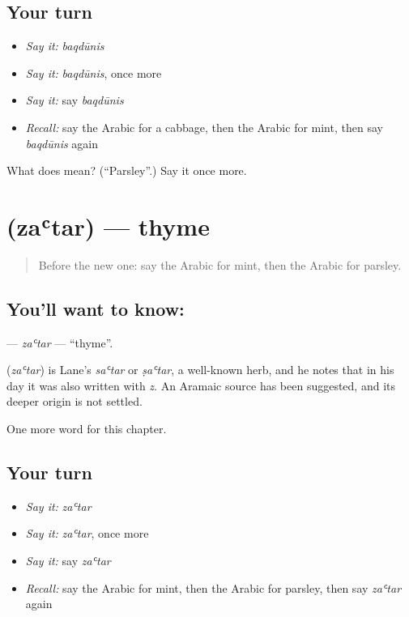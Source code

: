 \subsection*{Your turn}
\begin{itemize}
\raggedright
  \item \emph{Say it:} \emph{baqdūnis}
  \item \emph{Say it:} \emph{baqdūnis}, once more
  \item \emph{Say it:} say \emph{baqdūnis}
  \item \emph{Recall:} say the Arabic for a cabbage, then the Arabic for mint, then say \emph{baqdūnis} again
\end{itemize}

\begin{tcolorbox}[breakable,colback=teal!4,colframe=teal!35!black,title={Before you move on}]
What does  mean? (\textquotedblleft{}Parsley\textquotedblright{}.) Say it once more.
\end{tcolorbox}
\section[\texorpdfstring{\ar{زعتر} (zaʿtar)}{زعتر (zaʿtar)}]{ (zaʿtar) — thyme}

\label{lesson:AR-C121-zatar}



\begin{quote}
Before the new one: say the Arabic for mint, then the Arabic for parsley.
\end{quote}

\subsection*{You'll want to know: }
\textbf{} — \emph{zaʿtar} — \textquotedblleft{}thyme\textquotedblright{}.

\begin{cousinweb}
\textbf{} (\emph{zaʿtar}) is Lane's \emph{saʿtar} or \emph{ṣaʿtar}, a well-known herb, and he notes that in his day it was also written with \emph{z}. An Aramaic source has been suggested, and its deeper origin is not settled.
\end{cousinweb}

\begin{grammarlens}[title={What you've built}]
One more word for this chapter.
\end{grammarlens}

\subsection*{Your turn}
\begin{itemize}
\raggedright
  \item \emph{Say it:} \emph{zaʿtar}
  \item \emph{Say it:} \emph{zaʿtar}, once more
  \item \emph{Say it:} say \emph{zaʿtar}
  \item \emph{Recall:} say the Arabic for mint, then the Arabic for parsley, then say \emph{zaʿtar} again
\end{itemize}

